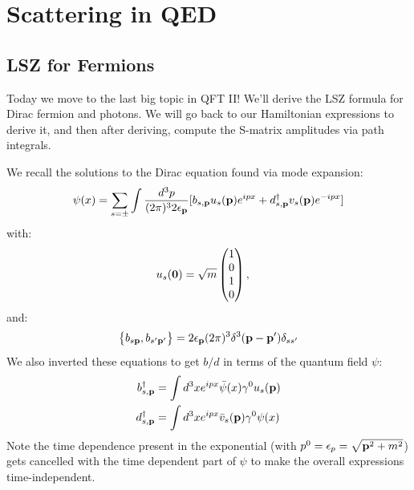 \section{Scattering in QED}
\subsection{LSZ for Fermions}
Today we move to the last big topic in QFT II! We'll derive the LSZ formula for Dirac fermion and photons. We will go back to our Hamiltonian expressions to derive it, and then after deriving, compute the S-matrix amplitudes via path integrals.

We recall the solutions to the Dirac equation found via mode expansion:
\begin{equation}
    \psi(x) = \sum_{s=\pm}\int \frac{d^3p}{(2\pi)^32\epsilon_{\mathbf{p}}}[b_{s, \mathbf{p}}u_s(\mathbf{p})e^{ipx} + d^\dagger_{s, \mathbf{p}}v_s(\mathbf{p})e^{-ipx}]
\end{equation}
with:
\begin{equation}
    u_s(\mathbf{0}) = \sqrt{m}\begin{pmatrix}1\\0\\1\\0\end{pmatrix}, \quad
\end{equation}
and:
\begin{equation}
    \set{b_{s\ensuremath{\mathbf{p}}}, b_{s'\ensuremath{\mathbf{p}}'}} = 2\epsilon_{\mathbf{p}}(2\pi)^3\delta^3(\mathbf{p} - \mathbf{p}')\delta_{ss'}
\end{equation}
We also inverted these equations to get $b/d$ in terms of the quantum field $\psi$:
\begin{equation}\label{eq:bdagddag}
    \begin{split}
        b^\dagger_{s, \mathbf{p}} &= \int d^3xe^{ipx}\bar{\psi}(x)\gamma^0 u_s(\mathbf{p})
        \\ d^\dagger_{s, \mathbf{p}} &= \int d^3x e^{ipx}\bar{v}_s(\mathbf{p})\gamma^0 \psi(x)
    \end{split}
\end{equation}
Note the time dependence present in the exponential (with $p^0 = \epsilon_p = \sqrt{\mathbf{p}^2 + m^2}$) gets cancelled with the time dependent part of $\psi$ to make the overall expressions time-independent.

